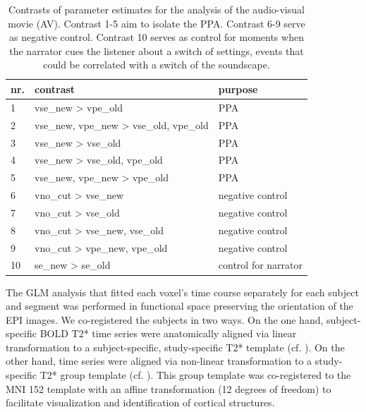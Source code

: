 \documentclass[english]{article}
\begin{document}
\begin{table}[t]
    \caption{Contrasts of parameter estimates for the analysis of the audio-visual movie (AV).
Contrast 1-5 aim to isolate the PPA.
    Contrast 6-9 serve as negative control.
    Contrast 10 serves as control for moments when the narrator cues the
    listener about a switch of settings, events that could be correlated with a
    switch of the soundscape.}
\label{tab:av-contrasts}
\footnotesize
\begin{tabular}{lll}
\toprule
\textbf{nr.} &  \textbf{contrast} & \textbf{purpose} \\
\midrule
1 & vse\_new > vpe\_old & PPA \tabularnewline
2 & vse\_new, vpe\_new > vse\_old, vpe\_old & PPA \tabularnewline
3 & vse\_new > vse\_old & PPA \tabularnewline
4 & vse\_new > vse\_old, vpe\_old & PPA \tabularnewline
5 & vse\_new, vpe\_new > vpe\_old & PPA \tabularnewline
6 & vno\_cut > vse\_new & negative control \tabularnewline
7 & vno\_cut > vse\_old & negative control \tabularnewline
8 & vno\_cut > vse\_new, vse\_old & negative control \tabularnewline
9 & vno\_cut > vpe\_new, vpe\_old & negative control \tabularnewline
10 & se\_new > se\_old & control for narrator \tabularnewline
\end{tabular}
\end{table}

The GLM analysis that fitted each voxel's time course separately for each
subject and segment was performed in functional space preserving the orientation
of the EPI images.
We co-registered the subjects in two ways.
On the one hand, subject-specific BOLD T2* time series were anatomically aligned
via linear transformation to a subject-specific, study-specific T2* template
(cf. \citep{sengupta2016extension}).
On the other hand, time series were aligned via non-linear transformation to a
study-specific T2* group template (cf. \citep{hanke2014audiomovie}).
This group template was co-registered to the MNI 152 template with an affine
transformation (12 degrees of freedom) to facilitate visualization and
identification of cortical structures.
\end{document}
